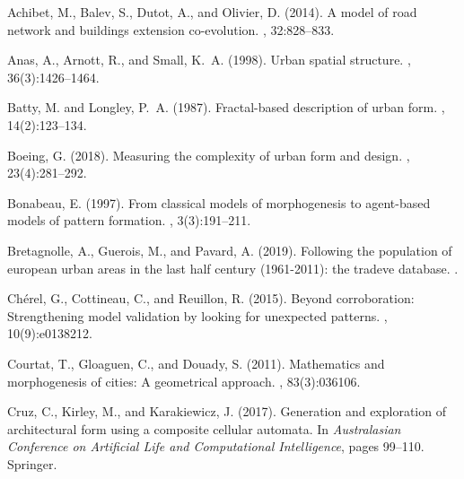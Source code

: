 \documentclass[letterpaper]{article}
\begin{document}
\footnotesize
\begin{thebibliography}{}

Achibet, M., Balev, S., Dutot, A., and Olivier, D. (2014).
\newblock A model of road network and buildings extension co-evolution.
, 32:828--833.

Anas, A., Arnott, R., and Small, K.~A. (1998).
\newblock Urban spatial structure.
, 36(3):1426--1464.

Batty, M. and Longley, P.~A. (1987).
\newblock Fractal-based description of urban form.
,
  14(2):123--134.

Boeing, G. (2018).
\newblock Measuring the complexity of urban form and design.
, 23(4):281--292.

Bonabeau, E. (1997).
\newblock From classical models of morphogenesis to agent-based models of
  pattern formation.
, 3(3):191--211.

Bretagnolle, A., Guerois, M., and Pavard, A. (2019).
\newblock Following the population of european urban areas in the last half
  century (1961-2011): the tradeve database.
.

Ch{\'e}rel, G., Cottineau, C., and Reuillon, R. (2015).
\newblock Beyond corroboration: Strengthening model validation by looking for
  unexpected patterns.
, 10(9):e0138212.

Courtat, T., Gloaguen, C., and Douady, S. (2011).
\newblock Mathematics and morphogenesis of cities: A geometrical approach.
, 83(3):036106.

Cruz, C., Kirley, M., and Karakiewicz, J. (2017).
\newblock Generation and exploration of architectural form using a composite
  cellular automata.
\newblock In {\em Australasian Conference on Artificial Life and Computational
  Intelligence}, pages 99--110. Springer.


\end{thebibliography}
\end{document}
